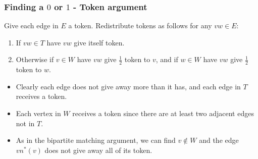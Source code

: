 \documentclass{beamer}
\begin{document}
\begin{frame}
\frametitle{Finding a $0$ or $1$ - Token argument}
Give each edge in $E$ a token. Redistribute tokens as follows for any $vw \in E$:
\begin{enumerate}
\item If $vw \in T$ have $vw$ give itself token.
\item Otherwise if $v \in W$ have $vw$ give $\frac{1}{2}$ token to $v$, and if $w \in W$ have $vw$ give $\frac{1}{2}$ token to $w$.
\end{enumerate}
\begin{itemize}
\item<2-> Clearly each edge does not give away more than it has, and each edge in $T$ receives a token.
\item<3-> Each vertex in $W$ receives a token since there are at least two adjacent edges not in $T$. 
\item<4-> As in the bipartite matching argument, we can find $v \not\in W$ and the edge $vn^*(v)$ does not give away all of its token. 
\end{itemize}
\end{frame}
\end{document}
